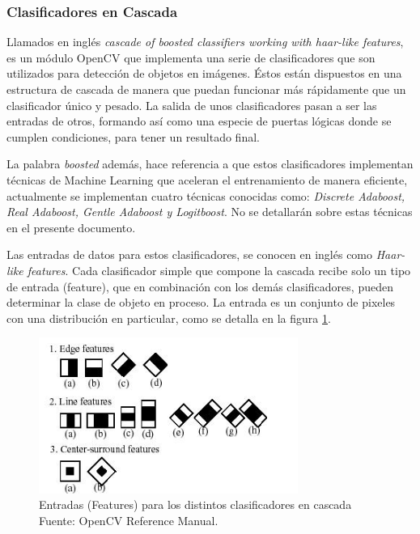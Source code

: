 \documentclass[a4paper,12pt,oneside,spanish]{book}
\begin{document}
\subsubsection{Clasificadores en Cascada}

Llamados en inglés \textit{cascade of boosted classifiers working with haar-like features}, es un módulo OpenCV que implementa una serie de clasificadores que son utilizados para detección de objetos en imágenes. Éstos están dispuestos en una estructura de cascada de manera que puedan funcionar más rápidamente que un clasificador único y pesado. La salida de unos clasificadores pasan a ser las entradas de otros, formando así como una especie de puertas lógicas donde se cumplen condiciones, para tener un resultado final. \par

La palabra \textit{boosted} además, hace referencia a que estos clasificadores implementan técnicas de Machine Learning que aceleran el entrenamiento de manera eficiente, actualmente se implementan cuatro técnicas conocidas como: \textit{Discrete Adaboost, Real Adaboost, Gentle Adaboost y Logitboost}. No se detallarán sobre estas técnicas en el presente documento.\par

Las entradas de datos para estos clasificadores, se conocen en inglés como \textit{Haar-like features}. Cada clasificador simple que compone la cascada recibe solo un tipo de entrada (feature), que en combinación con los demás clasificadores, pueden determinar la clase de objeto en proceso. La entrada es un conjunto de pixeles con una distribución en particular, como se detalla en la figura \ref{fig:haarlike1}.\par

\begin{figure}[h!]
	\includegraphics[width=240pt]{Imagenes/haarlike.jpg}
	\centering
	\caption{Entradas (Features) para los distintos clasificadores en cascada Fuente: OpenCV Reference Manual.}
	\label{fig:haarlike1}
\end{figure}
\end{document}
